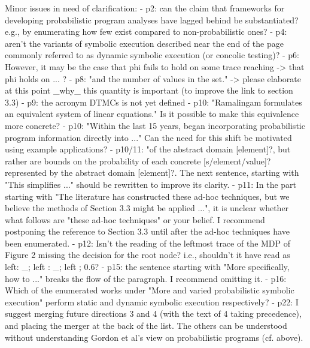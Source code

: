 \documentclass[12pm]{article}
\begin{document}
{Minor issues in need of clarification:
- p2: can the claim that frameworks for developing probabilistic program analyses have lagged behind be substantiated? e.g., by enumerating how few exist compared to non-probabilistic ones?
- p4: aren't the variants of symbolic execution described near the end of the page commonly referred to as dynamic symbolic execution (or concolic testing)?
- p6: However, it may be the case that phi fails to hold on some trace reaching -> that phi holds on ... ?
- p8: "and the number of values in the set." -> please elaborate at this point \_why\_ this quantity is important (to improve the link to section 3.3)
- p9: the acronym DTMCs is not yet defined
- p10: "Ramalingam formulates an equivalent system of linear equations." Is it possible to make this equivalence more concrete?
- p10: "Within the last 15 years, began incorporating probabilistic program information directly into ..." Can the need for this shift be motivated using example applications?
- p10/11: "of the abstract domain [element]?, but rather are bounds on the probability of each concrete [s/element/value]? represented by the abstract domain [element]?. The next sentence, starting with "This simplifies ..." should be rewritten to improve its clarity.
- p11: In the part starting with "The literature has constructed these ad-hoc techniques, but we believe the methods of Section 3.3 might be applied ...", it is unclear whether what follows are "these ad-hoc techniques" or your belief. I recommend postponing the reference to Section 3.3 until after the ad-hoc techniques have been enumerated.
- p12: Isn't the reading of the leftmost trace of the MDP of Figure 2 missing the decision for the root node? i.e., shouldn't it have read as left: \_; left : \_; left ; 0.6?
- p15: the sentence starting with "More specifically, how to ..." breaks the flow of the paragraph. I recommend omitting it.
- p16: Which of the enumerated works under "More and varied probabilistic symbolic execution" perform static and dynamic symbolic execution respectively?
- p22: I suggest merging future directions 3 and 4 (with the text of 4 taking precedence), and placing the merger at the back of the list. The others can be understood without understanding Gordon et al's view on probabilistic programs (cf. above). 

}
\end{document}
